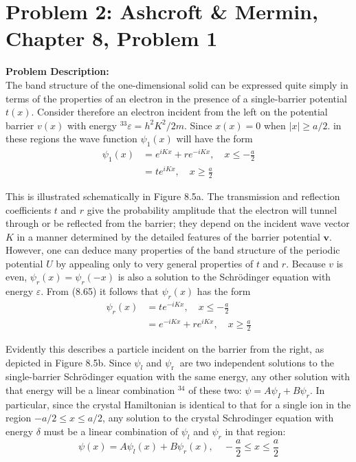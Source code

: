 \documentclass[12pt]{article}
\begin{document}
\section{Problem 2: Ashcroft \& Mermin, Chapter 8, Problem 1}
\noindent \textbf{Problem Description:} \\
The band structure of the one-dimensional solid can be expressed quite simply in terms of the properties of an electron in the presence of a single-barrier potential $t(x)$. Consider therefore an electron incident from the left on the potential barrier $v(x)$ with energy ${ }^{33} \varepsilon=h^2 K^2 / 2 m$. Since $x(x)=0$ when $|x| \geqslant a / 2$. in these regions the wave function $\psi_1(x)$ will have the form
$$
\begin{aligned}
\psi_1(x) & =e^{i K x}+r e^{-i K x}, \quad x \leqslant-\frac{a}{2} \\
& =t e^{i K x}, \quad x \geqslant \frac{a}{2}
\end{aligned}
$$

This is illustrated schematically in Figure 8.5a.
The transmission and reflection coefficients $t$ and $r$ give the probability amplitude that the electron will tunnel through or be reflected from the barrier; they depend on the incident wave vector $K$ in a manner determined by the detailed features of the barrier potential $\boldsymbol{v}$. However, one can deduce many properties of the band structure of the periodic potential $U$ by appealing only to very general properties of $t$ and $r$. Because $v$ is even, $\psi_r(x)=\psi_r(-x)$ is also a solution to the Schrödinger equation with energy $\varepsilon$. From (8.65) it follows that $\psi_r(x)$ has the form
$$
\begin{aligned}
\psi_r(x) & =t e^{-i K x}, \quad x \leqslant-\frac{a}{2} \\
& =e^{-i K x}+r e^{i K x}, \quad x \geqslant \frac{a}{2}
\end{aligned}
$$

Evidently this describes a particle incident on the barrier from the right, as depicted in Figure 8.5b.
Since $\psi_l$ and $\psi_{\text {r }}$ are two independent solutions to the single-barrier Schrödinger equation with the same energy, any other solution with that energy will be a linear combination ${ }^{34}$ of these two: $\psi=A \psi_I+B \psi_r$. In particular, since the crystal Hamiltonian is identical to that for a single ion in the region $-a / 2 \leqslant x \leqslant a / 2$, any solution to the crystal Schrodinger equation with energy $\delta$ must be a linear combination of $\psi_l$ and $\psi_r$ in that region:
$$
\psi(x)=A \psi_l(x)+B \psi_r(x), \quad-\frac{a}{2} \leqslant x \leqslant \frac{a}{2}
$$
\end{document}
